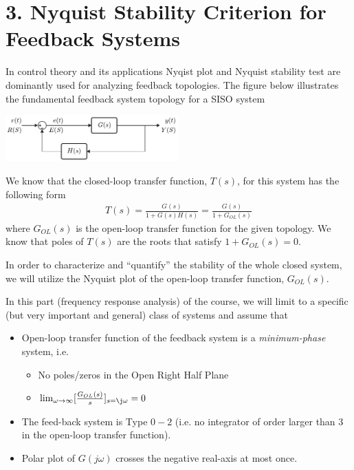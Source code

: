 \documentclass{article}
\begin{document}
\section*{3. Nyquist Stability Criterion for Feedback Systems}

In control theory and its applications Nyqist plot and Nyquist stability test are dominantly used for
analyzing feedback topologies. The figure below illustrates the fundamental feedback system topology for a SISO system

\vspace{6 pt}

  \begin{minipage}[h]{1\linewidth}
    \begin{center}
      \includegraphics[width=0.5\textwidth]{figs/unityfeedback}
    \end{center}
  \end{minipage}

\vspace{6 pt}

We know that the closed-loop transfer function, $T(s)$, for this
system has the following form
%
\begin{align*}
  T(s) = \frac{G(s)}{1 + G(s) H(s)} = \frac{G(s)}{1 + G_{OL}(s)}  
\end{align*}
%
where $G_{OL}(s)$ is the open-loop transfer function for the given
topology. We know that poles of $T(s)$ are the roots that satisfy 
$1 + G_{OL}(s) = 0$. 

In order to characterize and ``quantify'' the stability of the whole
closed system, we will utilize the Nyquist plot of the open-loop 
transfer function, $G_{OL}(s)$. 

In this part (frequency response analysis) of the course, we will
limit to a specific (but very important and general) class of systems 
and assume that 
%
\begin{itemize}
  \item Open-loop transfer function of the feedback system is a
    \textit{minimum-phase} system, i.e.
    \begin{itemize}
      \item No poles/zeros in the Open Right Half Plane
      \item $\lim_{\omega \to \infty} [ \frac{G_{OL}(s)}{s} ]_{s = \j \omega} = 0 $
    \end{itemize}    
  \item The feed-back system is Type $0-2$ (i.e. no integrator of
    order larger than 3 in the open-loop transfer function). 
    \item Polar plot of $G(j \omega)$ crosses the negative real-axis
      at most once. 
\end{itemize}
%
\end{document}
